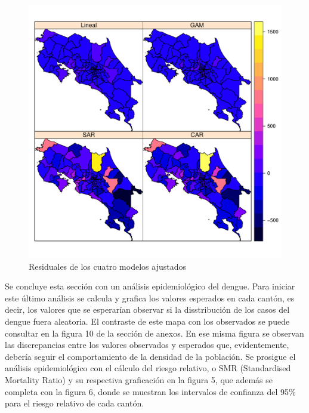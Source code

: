 \documentclass[12pt,a4paper]{article}
\begin{document}
\begin{figure}[hbtp]
\centering
\includegraphics[scale=0.75]{F4.pdf}
\caption{Residuales de los cuatro modelos ajustados}
\end{figure}
Se concluye esta sección con un análisis epidemiológico del dengue. Para iniciar este último análisis se calcula y grafica los valores esperados en cada cantón, es decir, los valores que se esperarían observar si la disstribución de los casos del dengue fuera aleatoria. El contraste de este mapa con los observados se puede consultar en la figura 10 de la sección de anexos. En ese misma figura se observan las discrepancias entre los valores observados y esperados que, evidentemente, debería seguir el comportamiento de la densidad de la población. Se prosigue el análisis epidemiológico con el cálculo del riesgo relativo, o SMR (Standardised Mortality Ratio) \cite{sp} y su respectiva graficación en la figura 5, que además se completa con la figura 6, donde se muestran los intervalos de confianza del 95\% para el riesgo relativo de cada cantón.
\end{document}

